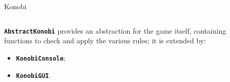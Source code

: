 \documentclass{beamer}
\begin{document}
  \begin{frame} {Konobi}

    \begin{minipage}{\textwidth}
    \begin{columns}[t]
      \begin{column}{0.40\textwidth}

        \vspace{3em}

        \justifying
        \texttt{\textbf{AbstractKonobi}} provides an abstraction for the game itself, containing functions to check and apply the various rules; it is extended by:

        \vspace{1em}

        \begin{itemize}
          \item \textbf{\texttt{KonobiConsole}};
          \item \textbf{\texttt{KonobiGUI}}.
        \end{itemize}

      \end{column}
      \begin{column}{0.50\textwidth}


      \end{column}
    \end{columns}
    \end{minipage}

  \end{frame}
\end{document}
